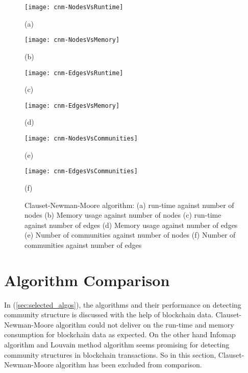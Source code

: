 \begin{figure}[H]
  \centering
  \begin{minipage}[b]{0.4\textwidth}
    \texttt{[image: cnm-NodesVsRuntime]}
    \caption*{(a)}
  \end{minipage}
  \begin{minipage}[b]{0.4\textwidth}
    \texttt{[image: cnm-NodesVsMemory]}
    \caption*{(b)}
  \end{minipage}
%
  \begin{minipage}[b]{0.4\textwidth}
    \texttt{[image: cnm-EdgesVsRuntime]}
    \caption*{(c)}
  \end{minipage}
  \begin{minipage}[b]{0.4\textwidth}
    \texttt{[image: cnm-EdgesVsMemory]}
    \caption*{(d)}
  \end{minipage}
%
  \begin{minipage}[b]{0.4\textwidth}
    \texttt{[image: cnm-NodesVsCommunities]}
    \caption*{(e)}
  \end{minipage}
  \begin{minipage}[b]{0.4\textwidth}
    \texttt{[image: cnm-EdgesVsCommunities]}
    \caption*{(f)}
  \end{minipage}
  \caption{Clauset-Newman-Moore algorithm: (a) run-time against number of nodes (b) Memory usage against number of nodes (c) run-time against number of edges (d) Memory usage against number of edges (e) Number of communities against number of nodes (f) Number of communities against number of edges}
  \label{fig:CNM-runs}
\end{figure}

\vfill
\pagebreak

\section{Algorithm Comparison}
In (\ref{sec:selected_algos}), the algorithms and their performance on detecting community structure is discussed with the help of blockchain data. Clauset-Newman-Moore algorithm could not deliver on the run-time and memory consumption for blockchain data as expected. On the other hand Infomap algorithm and Louvain method algorithm seems promising for detecting community structures in blockchain transactions. So in this section, Clauset-Newman-Moore algorithm has been excluded from comparison.

